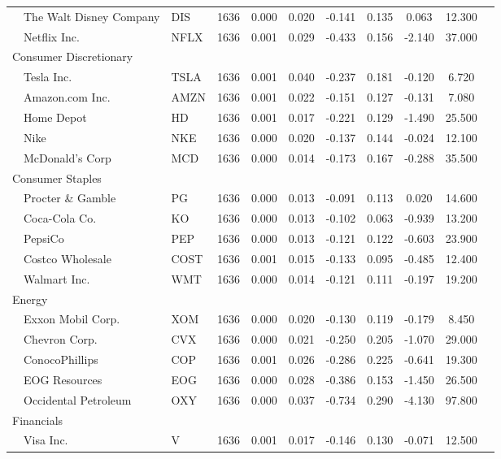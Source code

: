 \documentclass{article}
\begin{document}
\begin{table}[H]
\begin{threeparttable}
\begin{tabular}{p{1.75cm}p{3.5cm}lcccccccc}
& The Walt Disney Company & DIS    & 1636 & 0.000 & 0.020 & -0.141 & 0.135 & 0.063 & 12.300 \\
& Netflix Inc.            & NFLX   & 1636 & 0.001 & 0.029 & -0.433 & 0.156 & -2.140 & 37.000 \\
\multicolumn{2}{l}{Consumer Discretionary }  \\[1mm]
& Tesla Inc.         & TSLA & 1636 & 0.001 & 0.040 & -0.237 & 0.181 & -0.120 & 6.720 \\
& Amazon.com Inc.    & AMZN & 1636 & 0.001 & 0.022 & -0.151 & 0.127 & -0.131 & 7.080 \\
& Home Depot         & HD   & 1636 & 0.001 & 0.017 & -0.221 & 0.129 & -1.490 & 25.500 \\
& Nike               & NKE  & 1636 & 0.000 & 0.020 & -0.137 & 0.144 & -0.024 & 12.100 \\
& McDonald's Corp    & MCD  & 1636 & 0.000 & 0.014 & -0.173 & 0.167 & -0.288 & 35.500 \\
\multicolumn{2}{l}{Consumer Staples}\\[1mm]
& Procter \& Gamble   & PG  & 1636 & 0.000 & 0.013 & -0.091 & 0.113 & 0.020  & 14.600 \\
& Coca-Cola Co.       & KO  & 1636 & 0.000 & 0.013 & -0.102 & 0.063 & -0.939 & 13.200 \\
& PepsiCo             & PEP & 1636 & 0.000 & 0.013 & -0.121 & 0.122 & -0.603 & 23.900 \\
& Costco Wholesale    & COST& 1636 & 0.001 & 0.015 & -0.133 & 0.095 & -0.485 & 12.400 \\
& Walmart Inc.        & WMT & 1636 & 0.000 & 0.014 & -0.121 & 0.111 & -0.197 & 19.200 \\
\multicolumn{2}{l}{Energy}\\[1mm]
& Exxon Mobil Corp.  & XOM & 1636 & 0.000 & 0.020 & -0.130 & 0.119 & -0.179 & 8.450 \\
& Chevron Corp.      & CVX & 1636 & 0.000 & 0.021 & -0.250 & 0.205 & -1.070 & 29.000 \\
& ConocoPhillips     & COP & 1636 & 0.001 & 0.026 & -0.286 & 0.225 & -0.641 & 19.300 \\
& EOG Resources      & EOG & 1636 & 0.000 & 0.028 & -0.386 & 0.153 & -1.450 & 26.500 \\
& Occidental Petroleum & OXY & 1636 & 0.000 & 0.037 & -0.734 & 0.290 & -4.130 & 97.800 \\
\multicolumn{2}{l}{ Financials}   \\[1mm]
& Visa Inc.          & V    & 1636 & 0.001 & 0.017 & -0.146 & 0.130 & -0.071 & 12.500 \\

\end{tabular}
\end{threeparttable}
\end{table}
\end{document}
